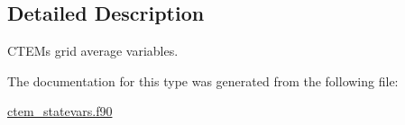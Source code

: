 \subsection{Detailed Description}
C\+T\+E\+M\textquotesingle{}s grid average variables. 

The documentation for this type was generated from the following file\+:\begin{DoxyCompactItemize}
\item 
\hyperlink{ctem__statevars_8f90}{ctem\+\_\+statevars.\+f90}\end{DoxyCompactItemize}
